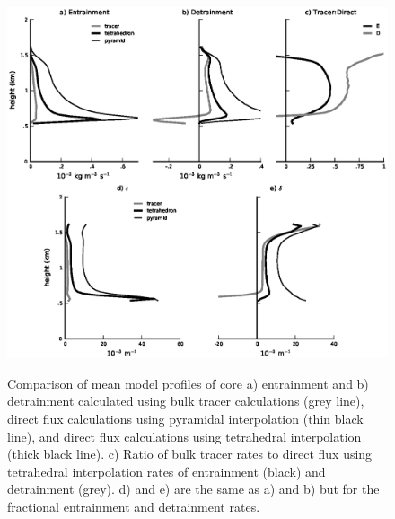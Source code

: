 \documentclass[12pt]{article}
\begin{document}
\begin{figure}[t]
  \noindent\includegraphics[width=40pc,angle=0]{./figures/direct_vs_tracer_core}\\
  \caption{Comparison of mean model profiles of core a) entrainment and b) 
detrainment calculated using bulk tracer calculations (grey line), direct flux
calculations using pyramidal interpolation (thin black line), and direct flux
calculations using tetrahedral interpolation (thick black line).  c) Ratio of 
bulk tracer rates to direct flux using tetrahedral interpolation rates of
entrainment (black) and detrainment (grey).  d) and e) are the same as 
a) and b) but for the fractional entrainment and detrainment rates.}\label{fig:direct_vs_tracer}
\end{figure}
\end{document}
